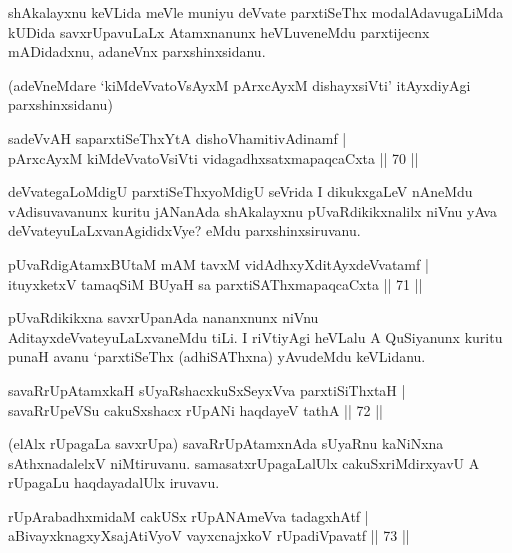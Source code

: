 \begin{artha}
shAkalayxnu keVLida meVle muniyu deVvate parxtiSeThx modalAdavugaLiMda kUDida savxrUpavuLaLx Atamxnanunx heVLuveneMdu parxtijecnx mADidadxnu, adaneVnx parxshinxsidanu.

(adeVneMdare `kiMdeVvatoV\s sAyxM pArxcAyxM dishayxsiVti' itAyxdiyAgi parxshinxsidanu)
\end{artha}


\begin{shl}
sadeVvAH saparxtiSeThxYtA dishoV\s hamitivAdinamf |\\
pArxcAyxM kiMdeVvatoV\s siVti vidagadhxsatxmapaqcaCxta \hfill || 70 ||
\end{shl}

\begin{artha}
deVvategaLoMdigU parxtiSeThxyoMdigU seVrida I dikukxgaLeV nAneMdu vAdisuvavanunx kuritu jANanAda shAkalayxnu pUvaRdikikxnalilx niVnu yAva deVvateyuLaLxvanAgididxVye? eMdu parxshinxsiruvanu.
\end{artha}


\begin{shl}
pUvaRdigAtamxBUtaM mAM tavxM vidAdhxyXditAyxdeVvatamf |\\
ituyxketxV tamaqSiM BUyaH sa parxtiSAThxmapaqcaCxta \hfill || 71 ||
\end{shl}

\begin{artha}
pUvaRdikikxna savxrUpanAda nananxnunx niVnu AditayxdeVvateyuLaLxvaneMdu tiLi. I riVtiyAgi heVLalu A QuSiyanunx kuritu punaH avanu `parxtiSeThx (adhiSAThxna) yAvudeMdu keVLidanu.
\end{artha}

\begin{shl}
savaRrUpAtamxkaH sUyaRshacxkuSxSeyxVva parxtiSiThxtaH |\\
savaRrUpeVSu cakuSxshacx rUpANi haqdayeV tathA \hfill || 72 ||
\end{shl}

\begin{artha}
(elAlx rUpagaLa savxrUpa) savaRrUpAtamxnAda sUyaRnu kaNiNxna sAthxnadalelxV niMtiruvanu. samasatxrUpagaLalUlx cakuSxriMdirxyavU A rUpagaLu haqdayadalUlx iruvavu.
\end{artha}

\begin{shl}
rUpArabadhxmidaM cakUSx rUpANAmeVva tadagxhAtf |\\
aBivayxknagxyXsajAtiVyoV vayxcnajxkoV \footnotemark[1]{}rUpadiVpavatf \hfill || 73 ||
\end{shl}

